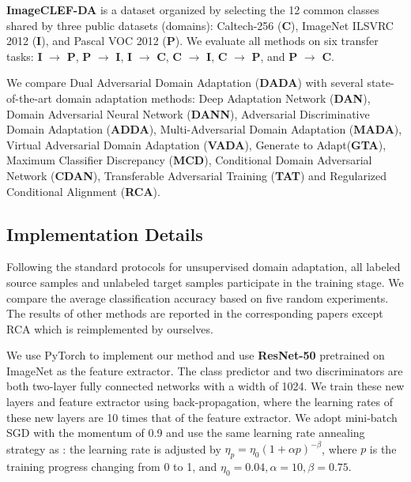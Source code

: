 \documentclass{ecai}
\begin{document}
\textbf{ImageCLEF-DA}\cite{b10} is a dataset organized by selecting the 12 common classes shared by three public datasets (domains): Caltech-256 (\textbf{C}), ImageNet ILSVRC 2012 (\textbf{I}), and Pascal VOC 2012 (\textbf{P}). We evaluate all methods on six transfer tasks: \textbf{I} $\rightarrow$ \textbf{P}, \textbf{P} $\rightarrow$ \textbf{I}, \textbf{I} $\rightarrow$ \textbf{C}, \textbf{C} $\rightarrow$ \textbf{I}, \textbf{C} $\rightarrow$ \textbf{P}, and \textbf{P} $\rightarrow$ \textbf{C}.

We compare Dual Adversarial Domain Adaptation (\textbf{DADA}) with several state-of-the-art domain adaptation methods: Deep Adaptation Network (\textbf{DAN})\cite{b9}, Domain Adversarial Neural Network (\textbf{DANN})\cite{b18}, Adversarial Discriminative Domain Adaptation (\textbf{ADDA})\cite{b33}, Multi-Adversarial Domain Adaptation (\textbf{MADA})\cite{b13}, Virtual Adversarial Domain Adaptation (\textbf{VADA})\cite{b40}, Generate to Adapt(\textbf{GTA})\cite{b39}, Maximum Classifier Discrepancy (\textbf{MCD})\cite{b24}, Conditional Domain Adversarial Network (\textbf{CDAN})\cite{b34}, Transferable Adversarial Training (\textbf{TAT})\cite{b35} and Regularized Conditional Alignment (\textbf{RCA})\cite{b17}.



\subsection{Implementation Details}

Following the standard protocols for unsupervised domain adaptation\cite{b18,b10}, all labeled source samples and unlabeled target samples participate in the training stage. We compare the average classification accuracy based on five random experiments. The results of other methods are reported in the corresponding papers except RCA which is reimplemented by ourselves.


We use PyTorch to implement our method and use \textbf{ResNet-50}\cite{b36} pretrained on ImageNet\cite{b38} as the feature extractor. The class predictor and two discriminators are both two-layer fully connected networks with a width of 1024. We train these new layers and feature extractor using back-propagation, where the learning rates of these new layers are 10 times that of the feature extractor. We adopt mini-batch SGD with the momentum of 0.9 and use the same learning rate annealing strategy as \cite{b18}: the learning rate is adjusted by $\eta_p = \eta_0(1+\alpha p)^{-\beta}$, where $p$ is the training progress changing from 0 to 1, and $\eta_0 = 0.04, \alpha = 10, \beta = 0.75$.
\end{document}
